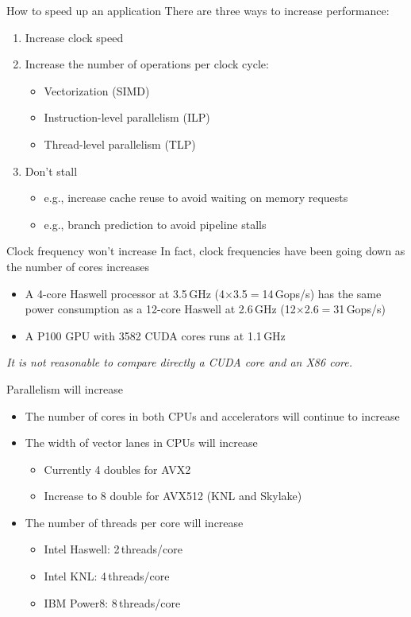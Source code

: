 \documentclass[aspectratio=169,12pt]{beamer}
\begin{document}
\begin{frame}{How to speed up an application}
  There are three ways to increase performance:
  \vfill
  \begin{enumerate}
  \item Increase clock speed
  \item Increase the number of operations per clock cycle:
    \begin{itemize}
    \item Vectorization (SIMD)
    \item Instruction-level parallelism (ILP)
    \item Thread-level parallelism (TLP)
    \end{itemize}
  \item Don't stall
    \begin{itemize}
    \item e.g., increase cache reuse to avoid waiting on memory requests
    \item e.g., branch prediction to avoid pipeline stalls
    \end{itemize}
  \end{enumerate}
\end{frame}

\begin{frame}{Clock frequency won't increase}
  In fact, clock frequencies have been going down as the number of cores increases
  \begin{itemize}
  \item A 4-core Haswell processor at 3.5\,GHz (4$\times$3.5$=$14\,Gops/s) has the same power consumption as a 12-core Haswell at 2.6\,GHz (12$\times$2.6$=$31\,Gops/s)
  \item A P100 GPU with 3582 CUDA cores runs at 1.1\,GHz
  \end{itemize}
  \vfill
  \emph{It is not reasonable to compare directly a CUDA core and an X86 core.}
\end{frame}

\begin{frame}{Parallelism will increase}
  \begin{itemize}
  \item The number of cores in both CPUs and accelerators will continue to increase
  \item The width of vector lanes in CPUs will increase
    \begin{itemize}
    \item Currently 4 doubles for AVX2
    \item Increase to 8 double for AVX512 (KNL and Skylake)
    \end{itemize}
  \item The number of threads per core will increase
    \begin{itemize}
    \item Intel Haswell: 2\,threads/core
    \item Intel KNL: 4\,threads/core
    \item IBM Power8: 8\,threads/core
    \end{itemize}
  \end{itemize}
\end{frame}
\end{document}
